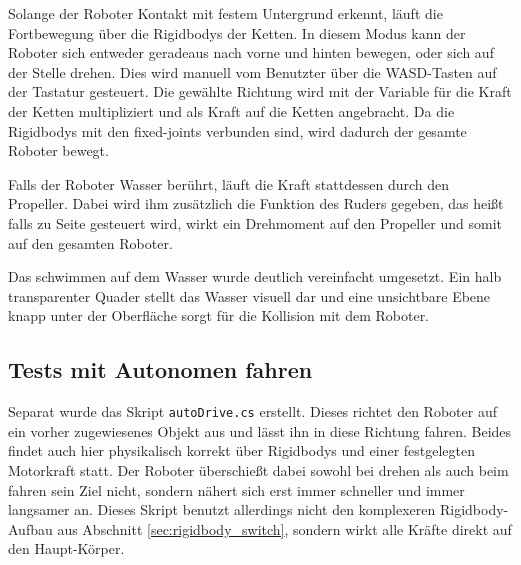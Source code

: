 Solange der Roboter Kontakt mit festem Untergrund erkennt, 
läuft die Fortbewegung über die Rigidbodys der Ketten.
In diesem Modus kann der Roboter sich entweder geradeaus nach vorne und hinten bewegen, 
oder sich auf der Stelle drehen.
Dies wird manuell vom Benutzter über die WASD-Tasten auf der Tastatur gesteuert.
Die gewählte Richtung wird mit der Variable für die Kraft der Ketten multipliziert 
und als Kraft auf die Ketten angebracht.
Da die Rigidbodys mit den fixed-joints verbunden sind, 
wird dadurch der gesamte Roboter bewegt.

Falls der Roboter Wasser berührt, läuft die Kraft stattdessen durch den Propeller.
Dabei wird ihm zusätzlich die Funktion des Ruders gegeben,
das heißt falls zu Seite gesteuert wird,
wirkt ein Drehmoment auf den Propeller und somit auf den gesamten Roboter.

Das schwimmen auf dem Wasser wurde deutlich vereinfacht umgesetzt.
Ein halb transparenter Quader stellt das Wasser visuell dar
und eine unsichtbare Ebene knapp unter der Oberfläche 
sorgt für die Kollision mit dem Roboter.

\subsection{Tests mit Autonomen fahren}
Separat wurde das Skript \texttt{autoDrive.cs} erstellt. 
Dieses richtet den Roboter auf ein vorher zugewiesenes Objekt aus 
und lässt ihn in diese Richtung fahren.
Beides findet auch hier physikalisch korrekt über Rigidbodys 
und einer festgelegten Motorkraft statt.
Der Roboter überschießt dabei sowohl bei drehen als auch beim fahren sein Ziel nicht, 
sondern nähert sich erst immer schneller und immer langsamer an.
Dieses Skript benutzt allerdings nicht den komplexeren Rigidbody-Aufbau 
aus Abschnitt \ref{sec:rigidbody_switch}, 
sondern wirkt alle Kräfte direkt auf den Haupt-Körper.